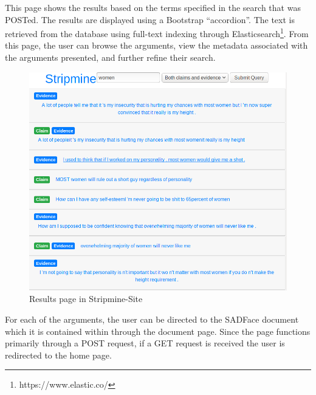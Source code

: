 \documentclass[12pt,a4paper]{article}
\begin{document}
This page shows the results based on the terms specified in the search that was POSTed. The results are displayed using a Bootstrap ``accordion''. The text is retrieved from the database using full-text indexing through Elasticsearch\footnote{https://www.elastic.co/}. From this page, the user can browse the arguments, view the metadata associated with the arguments presented, and further refine their search.
\newline
\begin{figure}[H]
    \centering
    \includegraphics[scale=0.5]{Report/graphics/results-1.png}
    \caption{Results page in Stripmine-Site}
    \label{fig:results1}
\end{figure}

For each of the arguments, the user can be directed to the SADFace document which it is contained within through the document page. Since the page functions primarily through a POST request, if a GET request is received the user is redirected to the home page.
\end{document}
